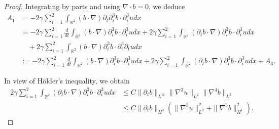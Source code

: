 \documentclass[reqno,11pt]{amsart}
\def\R{\mathbb R}
\numberwithin{Thm}{section}
\begin{document}
\begin{proof}
Integrating by parts and using $\nabla\cdot b=0$, we deduce
 \begin{align}\label{A--1}
A_{1}&=-2\gamma\sum_{i=1}^2\int_{\R^2}(b\cdot\nabla)\partial_t\partial_i^3 b\cdot\partial_i^3 udx\nonumber\\
&=-2\gamma\sum_{i=1}^2\frac{d}{dt}\int_{\R^2}(b\cdot\nabla)\partial_i^3 b\cdot\partial_i^3 udx+2\gamma\sum_{i=1}^2\int_{\R^2}(\partial_t b\cdot\nabla)\partial_i^3 b\cdot\partial_i^3 udx\nonumber\\
&\quad+2\gamma\sum_{i=1}^2\int_{\R^2}( b\cdot\nabla)\partial_i^3 b\cdot\partial_i^3\partial_t udx\nonumber\\
&:=-2\gamma\sum_{i=1}^2\frac{d}{dt}\int_{\R^2}(b\cdot\nabla)\partial_i^3 b\cdot\partial_i^3 udx+2\gamma\sum_{i=1}^2\int_{\R^2}(\partial_t b\cdot\nabla)\partial_i^3 b\cdot\partial_i^3 udx+A_{3}.
\end{align}





In view of  H\"{o}lder's inequality, we obtain
\begin{align}\label{A1}
2\gamma\sum_{i=1}^2\int_{\R^2}(\partial_t b\cdot\nabla)\partial_i^3 b\cdot\partial_i^3 udx&\leq
C\|\partial_t b\|_{L^{\infty}}\|\nabla^3u\|_{L^2}\|\nabla^4b\|_{L^2}\nonumber\\
&\leq C\|\partial_{t}b\|_{H^{3}}(\|\nabla^3u\|_{L^2}^2+\|\nabla^3b\|_{H^1}^2).
\end{align}



\end{proof}
\end{document}
